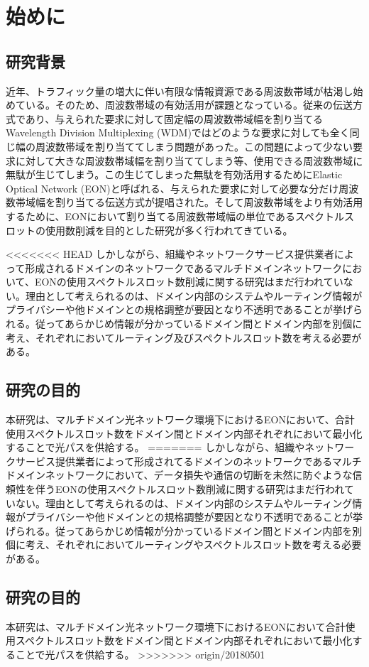 \documentclass[a4j,twocolumn,fleqn]{jarticle}
\begin{document}
 
\Title
\section{始めに}
\subsection{研究背景}
近年、トラフィック量の増大に伴い有限な情報資源である周波数帯域が枯渇し始めている。そのため、周波数帯域の有効活用が課題となっている。従来の伝送方式であり、与えられた要求に対して固定幅の周波数帯域幅を割り当てるWavelength Division Multiplexing (WDM)ではどのような要求に対しても全く同じ幅の周波数帯域を割り当ててしまう問題があった。この問題によって少ない要求に対して大きな周波数帯域幅を割り当ててしまう等、使用できる周波数帯域に無駄が生じてしまう。この生じてしまった無駄を有効活用するためにElastic Optical Network (EON)と呼ばれる、与えられた要求に対して必要な分だけ周波数帯域幅を割り当てる伝送方式が提唱された。そして周波数帯域をより有効活用するために、EONにおいて割り当てる周波数帯域幅の単位であるスペクトルスロットの使用数削減を目的とした研究が多く行われてきている。

<<<<<<< HEAD
しかしながら、組織やネットワークサービス提供業者によって形成されるドメインのネットワークであるマルチドメインネットワークにおいて、EONの使用スペクトルスロット数削減に関する研究はまだ行われていない。理由として考えられるのは、ドメイン内部のシステムやルーティング情報がプライバシーや他ドメインとの規格調整が要因となり不透明であることが挙げられる。従ってあらかじめ情報が分かっているドメイン間とドメイン内部を別個に考え、それぞれにおいてルーティング及びスペクトルスロット数を考える必要がある。
\subsection{研究の目的}
本研究は、マルチドメイン光ネットワーク環境下におけるEONにおいて、合計使用スペクトルスロット数をドメイン間とドメイン内部それぞれにおいて最小化することで光パスを供給する。
=======
しかしながら、組織やネットワークサービス提供業者によって形成されてるドメインのネットワークであるマルチドメインネットワークにおいて、データ損失や通信の切断を未然に防ぐような信頼性を伴うEONの使用スペクトルスロット数削減に関する研究はまだ行われていない。理由として考えられるのは、ドメイン内部のシステムやルーティング情報がプライバシーや他ドメインとの規格調整が要因となり不透明であることが挙げられる。従ってあらかじめ情報が分かっているドメイン間とドメイン内部を別個に考え、それぞれにおいてルーティングやスペクトルスロット数を考える必要がある。
\subsection{研究の目的}
本研究は、マルチドメイン光ネットワーク環境下におけるEONにおいて合計使用スペクトルスロット数をドメイン間とドメイン内部それぞれにおいて最小化することで光パスを供給する。
>>>>>>> origin/20180501
\end{document}
